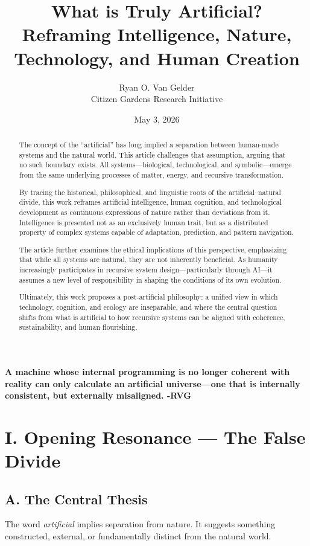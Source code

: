 \documentclass[12pt]{article}
\title{What is Truly Artificial?\\
\large Reframing Intelligence, Nature, Technology, and Human Creation}
\author{Ryan O. Van Gelder \\ 
Citizen Gardens Research Initiative}
\date{May 3, 2026}
\begin{document}
\maketitle
\textbf{A machine whose internal programming is no longer coherent with reality can only calculate an artificial universe—one that is internally consistent, but externally misaligned. -RVG}
\onehalfspacing
\begin{abstract}

The concept of the “artificial” has long implied a separation between human-made systems and the natural world. This article challenges that assumption, arguing that no such boundary exists. All systems—biological, technological, and symbolic—emerge from the same underlying processes of matter, energy, and recursive transformation.

By tracing the historical, philosophical, and linguistic roots of the artificial–natural divide, this work reframes artificial intelligence, human cognition, and technological development as continuous expressions of nature rather than deviations from it. Intelligence is presented not as an exclusively human trait, but as a distributed property of complex systems capable of adaptation, prediction, and pattern navigation.

The article further examines the ethical implications of this perspective, emphasizing that while all systems are natural, they are not inherently beneficial. As humanity increasingly participates in recursive system design—particularly through AI—it assumes a new level of responsibility in shaping the conditions of its own evolution.

Ultimately, this work proposes a post-artificial philosophy: a unified view in which technology, cognition, and ecology are inseparable, and where the central question shifts from what is artificial to how recursive systems can be aligned with coherence, sustainability, and human flourishing.

\end{abstract}
\newpage
\section*{I. Opening Resonance — The False Divide}

\subsection*{A. The Central Thesis}

The word \textit{artificial} implies separation from nature. It suggests something constructed, external, or fundamentally distinct from the natural world.
\end{document}
